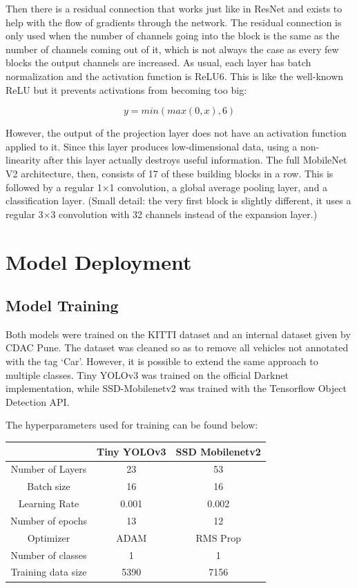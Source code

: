 \documentclass[12pt,letterpaper]{article}
\begin{document}
Then there is a residual connection that works just like in ResNet and exists to help with the flow of gradients through the network. The residual connection is only used when the number of channels going into the block is the same as the number of channels coming out of it, which is not always the case as every few blocks the output channels are increased. As usual, each layer has batch normalization and the activation function is ReLU6. This is like the well-known ReLU but it prevents activations from becoming too big:

\[  y = min(max(0,x),6)  \]

However, the output of the projection layer does not have an activation function applied to it. Since this layer produces low-dimensional data, using a non-linearity after this layer actually destroys useful information.
The full MobileNet V2 architecture, then, consists of 17 of these building blocks in a row. This is followed by a regular 1×1 convolution, a global average pooling layer, and a classification layer. (Small detail: the very first block is slightly different, it uses a regular 3×3 convolution with 32 channels instead of the expansion layer.)

\section{Model Deployment}

\subsection{Model Training}

Both models were trained on the KITTI dataset and an internal dataset given by CDAC Pune. The dataset was cleaned so as to remove all vehicles not annotated with the tag `Car'. However, it is possible to extend the same approach to multiple classes. Tiny YOLOv3 was trained on the official Darknet implementation, while SSD-Mobilenetv2 was trained with the Tensorflow Object Detection API.

The hyperparameters used for training can be found below:

\medskip

\begin{center}
\begin{tabular}{c|cc}
     & Tiny YOLOv3 & SSD Mobilenetv2 \\
    \hline
    Number of Layers & 23 & 53 \\
    Batch size & 16 & 16 \\
    Learning Rate & 0.001 & 0.002 \\
    Number of epochs & 13 & 12 \\
    Optimizer & ADAM & RMS Prop \\
    Number of classes & 1 & 1 \\
    Training data size & 5390 & 7156 \\
\end{tabular}
\end{center}
\end{document}
